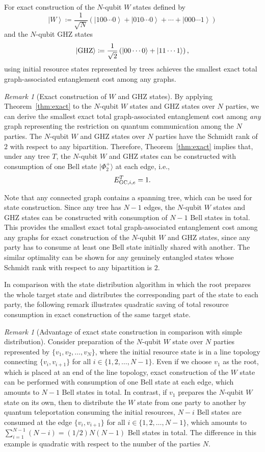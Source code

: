 \documentclass[preprintnumbers,aps,amsmath,amssymb,pra,twocolumn,showpacs,superscriptaddress,floatfix]{revtex4-1}
\def\Ket#1{\left|#1\right\rangle}
\newcommand{\ket}[1]{|{#1}\rangle}
\theoremstyle{plain}
\theoremstyle{definition}
\theoremstyle{remark}
\newtheorem{remark}[conjecture]{Remark}
\begin{document}
For exact construction of the $N$-qubit $W$ states defined by
\[
    \Ket{W}\coloneqq\frac{1}{\sqrt{N}}\left(\Ket{100\cdots 0}+\Ket{010\cdots 0}+\cdots+\Ket{000\cdots 1}\right)
\]
and the $N$-qubit GHZ states
\[
  \Ket{\textup{GHZ}}\coloneqq\frac{1}{\sqrt{2}}\left(\Ket{00\cdots 0}+\Ket{11\cdots 1}\right),
\]
using initial resource states represented by trees achieves the smallest exact total graph-associated entanglement cost among any graphs.
\begin{remark}[Exact construction of $W$ and GHZ states]
By applying Theorem~\ref{thm:exact} to the $N$-qubit $W$ states and GHZ states over $N$ parties, we can derive the smallest exact total graph-associated entanglement cost among \textit{any} graph representing the restriction on quantum communication among the $N$ parties.
The $N$-qubit $W$ and GHZ states over $N$ parties have the Schmidt rank of $2$ with respect to any bipartition.
Therefore, Theorem~\ref{thm:exact} implies that, under any tree $T$, the $N$-qubit $W$ and GHZ states can be constructed with consumption of one Bell state $\ket{\Phi_2^+}$ at each edge,
i.e.,\ 
  \[
  E_{\textup{GC},i,e}^T = 1.
\]

Note that any connected graph contains a spanning tree, which can be used for state construction.
Since any tree has $N-1$ edges, the $N$-qubit $W$ states and GHZ states can be constructed with consumption of $N-1$ Bell states in total.
This provides the smallest exact total graph-associated entanglement cost among any graphs for exact construction of the $N$-qubit $W$ and GHZ states, since any party has to consume at least one Bell state initially shared with another.  The similar optimality can be shown for any genuinely entangled states whose Schmidt rank with respect to any bipartition is $2$.
\end{remark}

In comparison with the state distribution algorithm in which the root prepares the whole target state and distributes the corresponding part of the state to each party, the following remark illustrates quadratic saving of total resource consumption in exact construction of the same target state.
\begin{remark}[Advantage of exact state construction in comparison with simple distribution]
    Consider preparation of the $N$-qubit $W$ state over $N$ parties represented by $\{v_1,v_2,\ldots,v_N\}$, where the initial resource state is in a line topology connecting $\{v_i,v_{i+1}\}$ for all $i\in\{1,2,\ldots,N-1\}$.
    Even if we choose $v_1$ as the root, which is placed at an end of the line topology, exact construction of the $W$ state can be performed with consumption of one Bell state at each edge, which amounts to $N-1$ Bell states in total.
    In contrast, if $v_1$ prepares the $N$-qubit $W$ state on its own, then to distribute the $W$ state from one party to another by quantum teleportation consuming the initial resources, $N-i$ Bell states are consumed at the edge $\{v_i,v_{i+1}\}$ for all $i\in\{1,2,\ldots,N-1\}$, which amounts to $\sum_{i=1}^{N-1}\left(N-i\right)=(1/2)N(N-1)$ Bell states in total.
    The difference in this example is quadratic with respect to the number of the parties $N$.
\end{remark}
\end{document}
